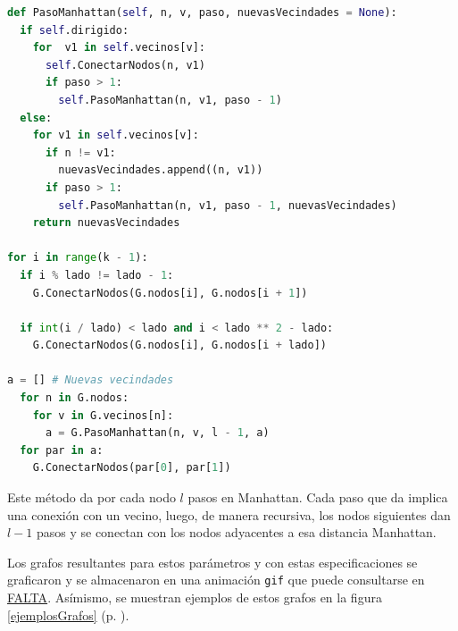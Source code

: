 \documentclass{article}
\begin{document}
  \begin{lstlisting}[language = Python]
def PasoManhattan(self, n, v, paso, nuevasVecindades = None):
  if self.dirigido:
    for  v1 in self.vecinos[v]:
      self.ConectarNodos(n, v1)
      if paso > 1:
        self.PasoManhattan(n, v1, paso - 1)
  else:
    for v1 in self.vecinos[v]:
      if n != v1:
        nuevasVecindades.append((n, v1))
      if paso > 1:
        self.PasoManhattan(n, v1, paso - 1, nuevasVecindades)
    return nuevasVecindades

for i in range(k - 1):
  if i % lado != lado - 1:
    G.ConectarNodos(G.nodos[i], G.nodos[i + 1])

  if int(i / lado) < lado and i < lado ** 2 - lado:
    G.ConectarNodos(G.nodos[i], G.nodos[i + lado])

a = [] # Nuevas vecindades
  for n in G.nodos:
    for v in G.vecinos[n]:
      a = G.PasoManhattan(n, v, l - 1, a)
  for par in a:
    G.ConectarNodos(par[0], par[1])
  \end{lstlisting}

  Este método da por cada nodo $l$ pasos en Manhattan. Cada paso que da implica una conexión con un vecino, luego, de manera recursiva, los nodos siguientes dan $l - 1$ pasos y se conectan con los nodos adyacentes a esa distancia Manhattan.

  Los grafos resultantes para estos parámetros y con estas especificaciones se graficaron y se almacenaron en una animación \texttt{gif} que puede consultarse en \url{FALTA}. Asímismo, se muestran ejemplos de estos grafos en la figura \ref{ejemplosGrafos} (p. \pageref{ejemplosGrafos}).
\end{document}
